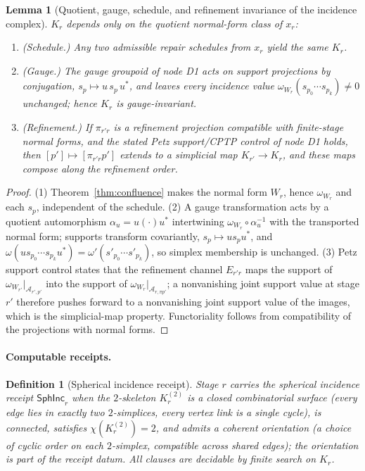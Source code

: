 \documentclass[11pt]{article}
\newtheorem{lemma}[theorem]{Lemma}
\newtheorem{definition}[theorem]{Definition}
\begin{document}
\begin{lemma}[Quotient, gauge, schedule, and refinement invariance of the incidence complex]
\label{lem:incidence-invariance}
\(K_r\) depends only on the quotient normal-form class of \(x_r\):
\begin{enumerate}[leftmargin=2em]
\item (Schedule.) Any two admissible repair schedules from \(x_r\) yield the
same \(K_r\).
\item (Gauge.) The gauge groupoid of node D1 acts on support projections by
conjugation, \(s_p\mapsto u\,s_p\,u^{*}\), and leaves every incidence value
\(\omega_{W_r}(s_{p_0}\cdots s_{p_k})\neq0\) unchanged; hence \(K_r\) is
gauge-invariant.
\item (Refinement.) If \(\pi_{r'r}\) is a refinement projection compatible
with finite-stage normal forms, and the stated Petz support/CPTP control of
node D1 holds, then \([p']\mapsto[\pi_{r'r}p']\) extends to a simplicial map
\(K_{r'}\to K_r\), and these maps compose along the refinement order.
\end{enumerate}
\end{lemma}

\begin{proof}
(1) Theorem~\ref{thm:confluence} makes the normal form \(W_r\), hence
\(\omega_{W_r}\) and each \(s_p\), independent of the schedule. (2) A gauge
transformation acts by a quotient automorphism \(\alpha_u=u(\cdot)u^*\)
intertwining \(\omega_{W_r}\circ\alpha_u^{-1}\) with the transported normal
form; supports transform covariantly, \(s_p\mapsto us_pu^*\), and
\(\omega(u s_{p_0}\cdots s_{p_k}u^*)=\omega'(s'_{p_0}\cdots s'_{p_k})\), so
simplex membership is unchanged. (3) Petz support control states that the
refinement channel \(E_{r'r}\) maps the support of
\(\omega_{W_{r'}}|_{\mathcal A_{r',p'}}\) into the support of
\(\omega_{W_r}|_{\mathcal A_{r,\pi p'}}\); a nonvanishing joint support value
at stage \(r'\) therefore pushes forward to a nonvanishing joint support value
of the images, which is the simplicial-map property. Functoriality follows
from compatibility of the projections with normal forms.
\end{proof}

\paragraph{Computable receipts.}

\begin{definition}[Spherical incidence receipt]
\label{def:spherical-incidence-receipt}
Stage \(r\) carries the \emph{spherical incidence receipt}
\(\mathsf{SphInc}_r\) when the \(2\)-skeleton \(K^{(2)}_r\) is a closed
combinatorial surface (every edge lies in exactly two \(2\)-simplices, every
vertex link is a single cycle), is connected, satisfies
\(\chi(K^{(2)}_r)=2\), and admits a coherent orientation (a choice of cyclic
order on each \(2\)-simplex, compatible across shared edges); the orientation
is part of the receipt datum. All clauses are decidable by finite search on
\(K_r\).
\end{definition}
\end{document}
